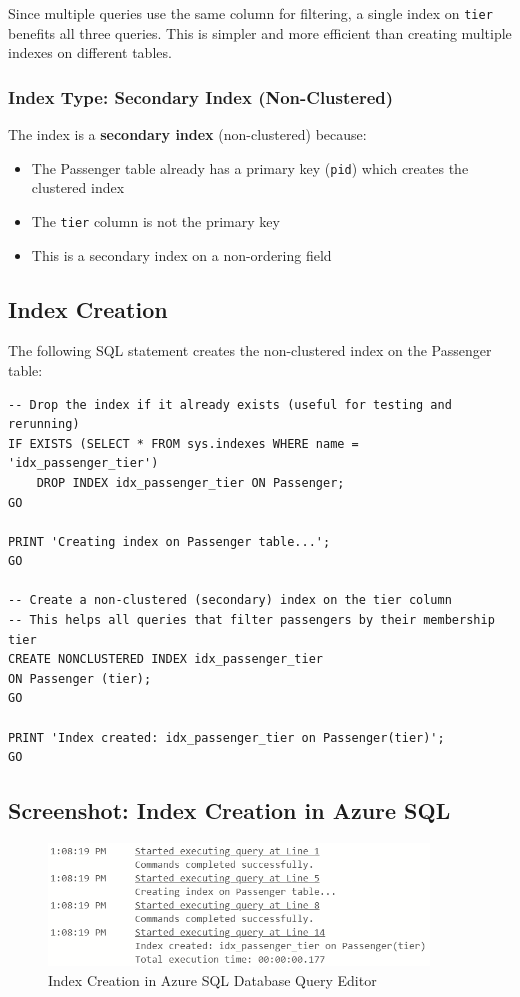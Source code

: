 \documentclass[12pt]{article}
\begin{document}
Since multiple queries use the same column for filtering, a single index on \texttt{tier} benefits all three queries. This is simpler and more efficient than creating multiple indexes on different tables.

\subsubsection{Index Type: Secondary Index (Non-Clustered)}

The index is a \textbf{secondary index} (non-clustered) because:

\begin{itemize}
    \item The Passenger table already has a primary key (\texttt{pid}) which creates the clustered index
    \item The \texttt{tier} column is not the primary key
    \item This is a secondary index on a non-ordering field
\end{itemize}

\subsection{Index Creation}

The following SQL statement creates the non-clustered index on the Passenger table:

\begin{lstlisting}[caption=Index Creation SQL]
-- Drop the index if it already exists (useful for testing and rerunning)
IF EXISTS (SELECT * FROM sys.indexes WHERE name = 'idx_passenger_tier')
    DROP INDEX idx_passenger_tier ON Passenger;
GO

PRINT 'Creating index on Passenger table...';
GO

-- Create a non-clustered (secondary) index on the tier column
-- This helps all queries that filter passengers by their membership tier
CREATE NONCLUSTERED INDEX idx_passenger_tier
ON Passenger (tier);
GO

PRINT 'Index created: idx_passenger_tier on Passenger(tier)';
GO
\end{lstlisting}

\subsection{Screenshot: Index Creation in Azure SQL}

\begin{figure}[h]
\centering
\includegraphics[width=0.9\textwidth]{../../../Screenshots/Problem2/Index_creation.png}
\caption{Index Creation in Azure SQL Database Query Editor}
\label{fig:index_creation}
\end{figure}
\end{document}
